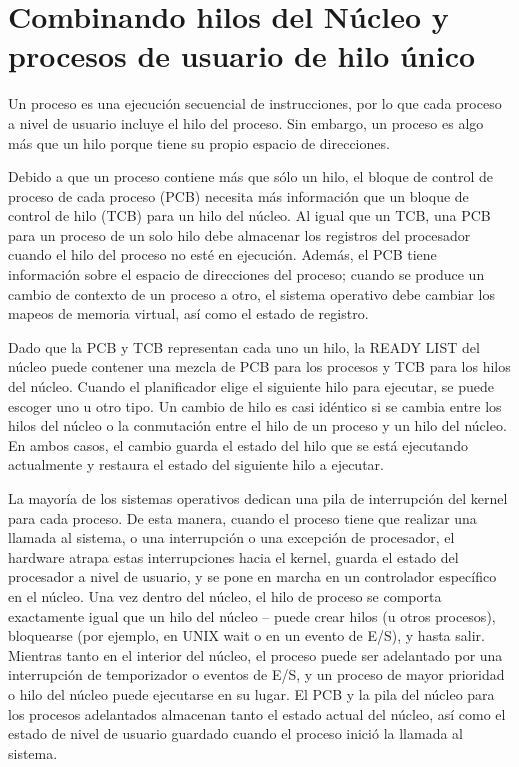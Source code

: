 \documentclass[10pt]{book}
\begin{document}
\section{Combinando hilos del Núcleo y procesos de usuario de hilo único}
Un proceso es una ejecución secuencial de instrucciones, por lo que cada proceso a nivel de usuario incluye el hilo del proceso. Sin embargo, un proceso es algo más que un hilo porque tiene su propio espacio de direcciones.

Debido a que un proceso contiene más que sólo un hilo, el bloque de control de proceso de cada proceso (PCB) necesita más información que un bloque de control de hilo (TCB) para un hilo del núcleo. Al igual que un TCB, una PCB para un proceso de un solo hilo debe almacenar los registros del procesador cuando el hilo del proceso no esté en ejecución. Además, el PCB tiene información sobre el espacio de direcciones del proceso; cuando se produce un cambio de contexto de un proceso a otro, el sistema operativo debe cambiar los mapeos de memoria virtual, así como el estado de registro.

Dado que la PCB y TCB representan cada uno un hilo, la READY LIST del núcleo puede contener una mezcla de PCB para los procesos y TCB para los hilos del núcleo. Cuando el planificador elige el siguiente hilo para ejecutar, se puede escoger uno u otro tipo. Un cambio de hilo es casi idéntico si se cambia entre los hilos del núcleo o la conmutación entre el hilo de un proceso y un hilo del núcleo. En ambos casos, el cambio guarda el estado del hilo que se está ejecutando actualmente y restaura el estado del siguiente hilo a ejecutar.

La mayoría de los sistemas operativos dedican una pila de interrupción del kernel para cada proceso. De esta manera, cuando el proceso tiene que realizar una llamada al sistema, o una interrupción o una excepción de procesador, el hardware atrapa estas interrupciones hacia el kernel, guarda el estado del procesador a nivel de usuario, y se pone en marcha en un controlador específico en el núcleo. Una vez dentro del núcleo, el hilo de proceso se comporta exactamente igual que un hilo del núcleo -- puede crear hilos (u otros procesos), bloquearse (por ejemplo, en UNIX {\mf wait } o en un evento de E/S), y hasta salir. Mientras tanto en el interior del núcleo, el proceso puede ser adelantado por una interrupción de temporizador o eventos de E/S, y un proceso de mayor prioridad o hilo del núcleo puede ejecutarse en su lugar. El PCB y la pila del núcleo para los procesos adelantados almacenan tanto el estado actual del núcleo, así como el estado de nivel de usuario guardado cuando el proceso inició la llamada al sistema.
\end{document}
